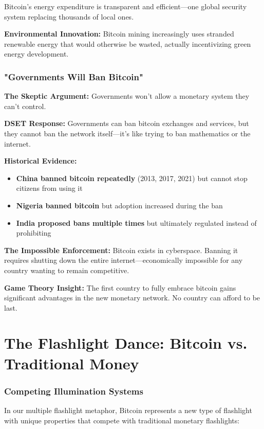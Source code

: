 \documentclass[11pt,oneside]{book}
\begin{document}
Bitcoin's energy expenditure is transparent and efficient—one global security system replacing thousands of local ones.

\textbf{Environmental Innovation:} Bitcoin mining increasingly uses stranded renewable energy that would otherwise be wasted, actually incentivizing green energy development.

\subsubsection{"Governments Will Ban Bitcoin"}

\textbf{The Skeptic Argument:} Governments won't allow a monetary system they can't control.

\textbf{DSET Response:} Governments can ban bitcoin exchanges and services, but they cannot ban the network itself—it's like trying to ban mathematics or the internet.

\textbf{Historical Evidence:}
\begin{itemize}
\item \textbf{China banned bitcoin repeatedly} (2013, 2017, 2021) but cannot stop citizens from using it
\item \textbf{Nigeria banned bitcoin} but adoption increased during the ban
\item \textbf{India proposed bans multiple times} but ultimately regulated instead of prohibiting
\end{itemize}

\textbf{The Impossible Enforcement:} Bitcoin exists in cyberspace. Banning it requires shutting down the entire internet—economically impossible for any country wanting to remain competitive.

\textbf{Game Theory Insight:} The first country to fully embrace bitcoin gains significant advantages in the new monetary network. No country can afford to be last.

\section{The Flashlight Dance: Bitcoin vs. Traditional Money}

\subsubsection{Competing Illumination Systems}

In our multiple flashlight metaphor, Bitcoin represents a new type of flashlight with unique properties that compete with traditional monetary flashlights:
\end{document}
